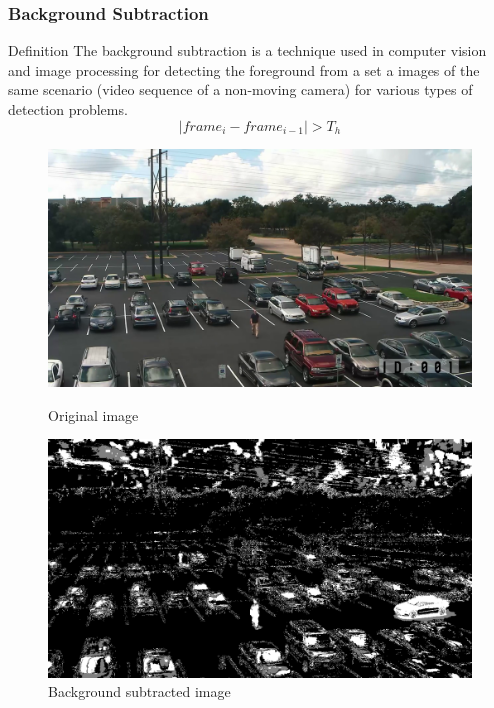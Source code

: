 \documentclass{beamer}
\begin{document}
\begin{frame}[allowframebreaks]
\frametitle{Background Subtraction}
\begin{block}{Definition}
The background subtraction is a technique used in computer vision and image processing for detecting the foreground from a set a images of the same scenario (video sequence of a non-moving camera) for various types of detection problems.
\begin{equation}
|frame_i - frame_{i-1}| > T_h 
\label{diff_frame}
\end{equation}
\end{block}
\vspace{5cm}
\begin{figure}[!htbp]
	\begin{minipage}[b]{0.48\textwidth}
		\includegraphics[width=\textwidth]{Pictures/fg308}
		\caption{Original image}
		\label{foreground}
	\end{minipage}
	\hfill
	\begin{minipage}[b]{0.48\textwidth}
		\includegraphics[width=\textwidth]{Pictures/bg308}
		\caption{Background subtracted image}
		\label{background}

\end{minipage}
\end{figure}
\end{frame}
\end{document}
